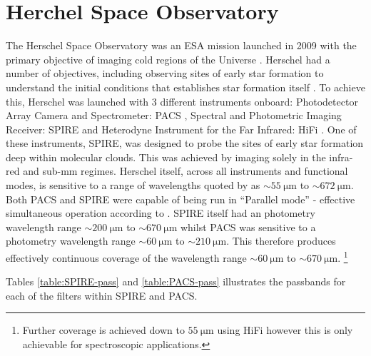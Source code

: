 \documentclass{report}
\begin{document}
\section{Herchel Space Observatory}
The Herschel Space Observatory was an ESA mission launched in 2009 with the primary objective of imaging cold regions of the Universe \parencite{herschel,fact}. Herschel had a number of objectives, including observing sites of early star formation to understand the initial conditions that establishes star formation itself \parencite{fact}. To achieve this, Herschel was launched with 3 different instruments onboard: Photodetector Array Camera and Spectrometer: PACS \parencite{PACS}, Spectral and Photometric Imaging Receiver: SPIRE \parencite{SPIRE} and Heterodyne Instrument for the Far Infrared: HiFi \parencite{HiFi}. One of these instruments, SPIRE, was designed to probe the sites of early star formation deep within molecular clouds. This was achieved by imaging solely in the infra-red and sub-mm regimes. Herschel itself, across all instruments and functional modes, is sensitive to a range of wavelengths quoted by \textcite{herschel} as $\sim \SI{55}{\micro\meter}$ to $\sim \SI{672}{\micro\meter}$. Both PACS and SPIRE were capable of being run in ``Parallel mode'' - effective simultaneous operation according to \textcite{herschel}. SPIRE itself had an photometry wavelength range
$\sim \SI{200}{\micro\meter}$ to $\sim \SI{670}{\micro\meter}$ whilst PACS was sensitive to a photometry wavelength range $\sim \SI{60}{\micro\meter}$ to $\sim \SI{210}{\micro\meter}$. This therefore produces effectively continuous coverage of the wavelength range $\sim \SI{60}{\micro\meter}$ to $\sim \SI{670}{\micro\meter}$.
\footnote{Further coverage is achieved down to $\SI{55}{\micro\meter}$ using HiFi however this is only achievable for spectroscopic applications.}

Tables \ref{table:SPIRE-pass} and \ref{table:PACS-pass} illustrates the passbands for each of the filters within SPIRE and PACS.
\end{document}
